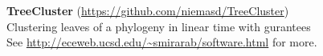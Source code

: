 \documentclass[margin,line,letterpaper]{resume}
\begin{document}
\begin{resume}
\textbf{TreeCluster} (\url{https://github.com/niemasd/TreeCluster})\\
Clustering leaves of a phylogeny in linear time with gurantees
\vspace{2mm}\\
See \url{http://eceweb.ucsd.edu/~smirarab/software.html} for more. 

\end{resume}
\end{document}
